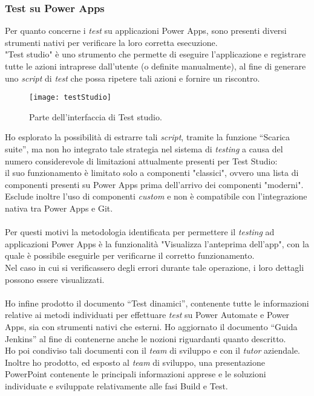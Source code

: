 \subsubsection*{Test su Power Apps}
Per quanto concerne i \emph{test} su applicazioni Power Apps, sono presenti diversi strumenti nativi per verificare la loro corretta esecuzione.\\
"Test studio" è uno strumento che permette di eseguire l'applicazione e registrare tutte le azioni intraprese dall'utente (o definite manualmente), al fine di generare uno \emph{script} di \emph{test} che possa ripetere tali azioni e fornire un riscontro.
\begin{figure}[htbp] 
    \centering 
    \texttt{[image: testStudio]} 
    \caption{Parte dell'interfaccia di Test studio.}
    \label{fig:testStudio}
\end{figure}
\newline \noindent Ho esplorato la possibilità di estrarre tali \emph{script}, tramite la funzione “Scarica suite”, ma non ho integrato tale strategia nel sistema di \emph{testing} a causa del numero considerevole di limitazioni attualmente presenti per Test Studio:\\
il suo funzionamento è limitato solo a componenti "classici", ovvero una lista di componenti presenti su Power Apps prima dell'arrivo dei componenti "moderni".\\
Esclude inoltre l'uso di componenti \emph{custom} e non è compatibile con l'integrazione nativa tra Power Apps e Git.\\\\
Per questi motivi la metodologia identificata per permettere il \emph{testing} ad applicazioni Power Apps è la funzionalità "Visualizza l'anteprima dell'app", con la quale è possibile eseguirle per verificarne il corretto funzionamento.\\
Nel caso in cui si verificassero degli errori durante tale operazione, i loro dettagli possono essere visualizzati.\\\\
Ho infine prodotto il documento “Test dinamici”, contenente tutte le informazioni relative ai metodi individuati per effettuare \emph{test} su Power Automate e Power Apps, sia con strumenti nativi che esterni.
Ho aggiornato il documento “Guida Jenkins” al fine di contenerne anche le nozioni riguardanti quanto descritto.\\
Ho poi condiviso tali documenti con il \emph{team} di sviluppo e con il \emph{\emph{tutor}} aziendale.\\
Inoltre ho prodotto, ed esposto al \emph{team} di sviluppo, una presentazione PowerPoint contenente le principali informazioni apprese e le soluzioni individuate e sviluppate relativamente alle fasi Build e Test. 


